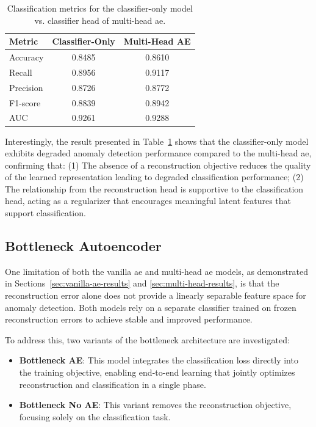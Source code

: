 \begin{table}[h!]
\centering
\caption{Classification metrics for the classifier-only model vs. classifier head of multi-head \gls{ae}.}
\label{tab:classifier-only-metrics}
\begin{tabular}{lcc}
    \toprule
    \textbf{Metric} & \textbf{Classifier-Only} & \textbf{Multi-Head AE} \\
    \midrule
    Accuracy & 0.8485 & 0.8610 \\
    Recall & 0.8956 & 0.9117 \\
    Precision & 0.8726 & 0.8772 \\
    F1-score & 0.8839 & 0.8942 \\
    AUC & 0.9261 & 0.9288 \\
    \bottomrule
\end{tabular}
\end{table}

Interestingly, the result presented in Table~\ref{tab:classifier-only-metrics} shows that the classifier-only model exhibits degraded anomaly detection performance compared to the multi-head \gls{ae}, confirming that:
(1) The absence of a reconstruction objective reduces the quality of the learned representation leading to degraded classification performance;
(2) The relationship from the reconstruction head is supportive to the classification head, acting as a regularizer that encourages meaningful latent features that support classification.



\subsection{Bottleneck Autoencoder}
One limitation of both the vanilla \gls{ae} and multi-head \gls{ae} models, as demonstrated in Sections~\ref{sec:vanilla-ae-results} and \ref{sec:multi-head-results}, is that the reconstruction error alone does not provide a linearly separable feature space for anomaly detection.
Both models rely on a separate classifier trained on frozen reconstruction errors to achieve stable and improved performance.

To address this, two variants of the bottleneck architecture are investigated: 

\begin{itemize}
    \item \textbf{Bottleneck AE}: This model integrates the classification loss directly into the training objective, enabling end-to-end learning that jointly optimizes reconstruction and classification in a single phase.
    \item \textbf{Bottleneck No AE}: This variant removes the reconstruction objective, focusing solely on the classification task.
\end{itemize}

